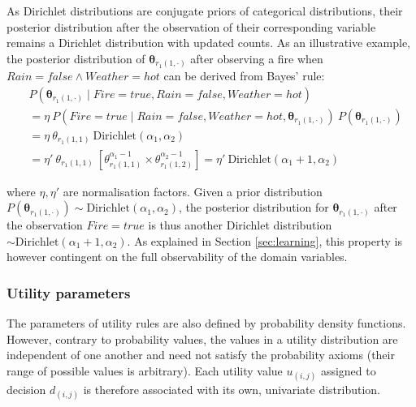 As Dirichlet distributions are conjugate priors of categorical distributions, their posterior distribution after the observation of their corresponding variable remains a Dirichlet distribution with updated counts. As an illustrative example, the posterior distribution of $\boldsymbol\theta_{r_{1}(1, \cdot)}$ after observing a fire when $\mathit{Rain}\!=\!\mathit{false} \land \mathit{Weather}\!=\!\mathit{hot}$ can be derived from Bayes' rule: 
\begin{align}
&P(\boldsymbol\theta_{r_{1}(1, \cdot)} \; | \; \mathit{Fire}\!=\!\mathit{true}, \mathit{Rain}\!=\!\mathit{false}, \mathit{Weather}\!=\!\mathit{hot}) \nonumber \\
& = \eta \ P(\mathit{Fire}\!=\!\mathit{true} \; | \; \mathit{Rain}\!=\!\mathit{false}, \mathit{Weather}\!=\!\mathit{hot}, \boldsymbol\theta_{r_{1}(1, \cdot)}) \ P(\boldsymbol\theta_{r_{1}(1, \cdot)}) \nonumber \\
& = \eta \ \theta_{r_{1}(1,1)} \ \mathrm{Dirichlet}(\alpha_1,\alpha_2) \nonumber \\
& = \eta' \ \theta_{r_{1}(1,1)} \ [ \theta_{r_{1}(1,1)}^{\alpha_1 - 1} \times \theta_{r_{1}(1,2)}^{\alpha_2 - 1} ]   = \eta' \ \textrm{Dirichlet}(\alpha_1+1,\alpha_2) \nonumber 
\end{align}

where $\eta, \eta'$ are normalisation factors.  Given a prior distribution $P(\boldsymbol\theta_{r_{1}(1, \cdot)}) \sim \mathrm{Dirichlet}(\alpha_1, \alpha_2)$, the posterior distribution for $\boldsymbol\theta_{r_{1}(1, \cdot)}$ after the observation  $\mathit{Fire}\!=\!\mathit{true}$ is thus another Dirichlet distribution $\sim \mathrm{Dirichlet}(\alpha_1+1,\alpha_2)$.  As explained in Section \ref{sec:learning}, this property is however contingent on the full observability of the domain variables. 



\subsubsection*{Utility parameters}

The parameters of utility rules are also defined by probability density functions.  However, contrary to probability values, the values in a utility distribution are independent of one another and need not satisfy the probability axioms (their range of possible values is arbitrary). Each utility value $u_{(i,j)}$ assigned to decision $d_{(i,j)}$ is therefore associated with its own, univariate distribution.

